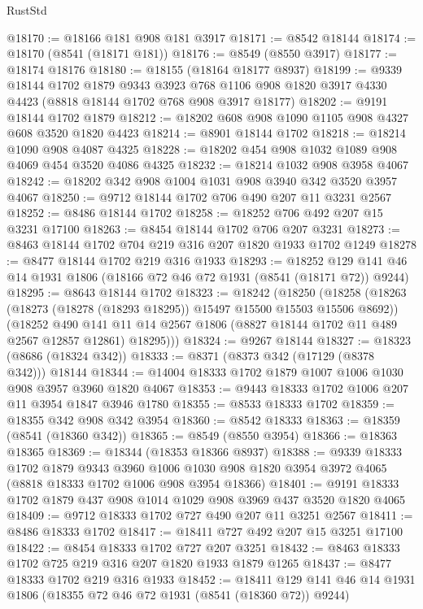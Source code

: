 \begin{lexlean}{RustStd}
\begin{coremodule}
@18170 := @18166 @181 @908 @181 @3917
@18171 := @8542 @18144
@18174 := @18170 (@8541 (@18171 @181))
@18176 := @8549 (@8550 @3917)
@18177 := @18174 @18176
@18180 := @18155 (@18164 @18177 @8937)
@18199 := @9339
    @18144
    @1702
    @1879
    @9343
    @3923
    @768
    @1106
    @908
    @1820
    @3917
    @4330
    @4423
    (@8818 @18144 @1702 @768 @908 @3917 @18177)
@18202 := @9191 @18144 @1702 @1879
@18212 := @18202 @608 @908 @1090 @1105 @908 @4327 @608 @3520 @1820 @4423
@18214 := @8901 @18144 @1702
@18218 := @18214 @1090 @908 @4087 @4325
@18228 := @18202 @454 @908 @1032 @1089 @908 @4069 @454 @3520 @4086 @4325
@18232 := @18214 @1032 @908 @3958 @4067
@18242 := @18202 @342 @908 @1004 @1031 @908 @3940 @342 @3520 @3957 @4067
@18250 := @9712 @18144 @1702 @706 @490 @207 @11 @3231 @2567
@18252 := @8486 @18144 @1702
@18258 := @18252 @706 @492 @207 @15 @3231 @17100
@18263 := @8454 @18144 @1702 @706 @207 @3231
@18273 := @8463 @18144 @1702 @704 @219 @316 @207 @1820 @1933 @1702 @1249
@18278 := @8477 @18144 @1702 @219 @316 @1933
@18293 := @18252 @129 @141 @46 @14 @1931 @1806 (@18166 @72 @46 @72 @1931 (@8541 (@18171 @72)) @9244)
@18295 := @8643 @18144 @1702
@18323 := @18242
    (@18250
      (@18258
        (@18263 (@18273 (@18278 (@18293 @18295)) @15497 @15500 @15503 @15506 @8692))
        (@18252
          @490
          @141
          @11
          @14
          @2567
          @1806
          (@8827 @18144 @1702 @11 @489 @2567 @12857 @12861)
          @18295)))
@18324 := @9267 @18144
@18327 := @18323 (@8686 (@18324 @342))
@18333 := @8371 (@8373 @342 (@17129 (@8378 @342))) @18144
@18344 := @14004 @18333 @1702 @1879 @1007 @1006 @1030 @908 @3957 @3960 @1820 @4067
@18353 := @9443 @18333 @1702 @1006 @207 @11 @3954 @1847 @3946 @1780
@18355 := @8533 @18333 @1702
@18359 := @18355 @342 @908 @342 @3954
@18360 := @8542 @18333
@18363 := @18359 (@8541 (@18360 @342))
@18365 := @8549 (@8550 @3954)
@18366 := @18363 @18365
@18369 := @18344 (@18353 @18366 @8937)
@18388 := @9339
    @18333
    @1702
    @1879
    @9343
    @3960
    @1006
    @1030
    @908
    @1820
    @3954
    @3972
    @4065
    (@8818 @18333 @1702 @1006 @908 @3954 @18366)
@18401 := @9191 @18333 @1702 @1879 @437 @908 @1014 @1029 @908 @3969 @437 @3520 @1820 @4065
@18409 := @9712 @18333 @1702 @727 @490 @207 @11 @3251 @2567
@18411 := @8486 @18333 @1702
@18417 := @18411 @727 @492 @207 @15 @3251 @17100
@18422 := @8454 @18333 @1702 @727 @207 @3251
@18432 := @8463 @18333 @1702 @725 @219 @316 @207 @1820 @1933 @1879 @1265
@18437 := @8477 @18333 @1702 @219 @316 @1933
@18452 := @18411 @129 @141 @46 @14 @1931 @1806 (@18355 @72 @46 @72 @1931 (@8541 (@18360 @72)) @9244)

\end{coremodule}
\end{lexlean}
